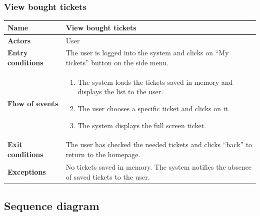 \subsubsection{View bought tickets}
\begin{table}[!h]
	\centering
	{\renewcommand{\arraystretch}{2}%
		\begin{tabular}{|l|p{12cm}|}
			\hline
			\textbf{Name} 				& \textbf{View bought tickets} \\ \hline
			\textbf{Actors} 			& User \\ \hline
			\textbf{Entry conditions} 	& The user is logged into the system and clicks on “My tickets” button on the side menu. \\ \hline
			\textbf{Flow of events}		& \begin{minipage}[t]{0.75\textwidth}
				\begin{enumerate}
					\item The system loads the tickets saved in memory and displays the list to the user.
					\item The user chooses a specific ticket and clicks on it.
					\item The system displays the full screen ticket.
				\end{enumerate}
			\end{minipage}	\\ \hline
			\textbf{Exit conditions}	& The user has checked the needed tickets and clicks “back” to return to the homepage.   \\ \hline
			\textbf{Exceptions}			& No tickets saved in memory. The system notifies the absence of saved tickets to the user. \\ \hline
	\end{tabular}}
\end{table}
\clearpage

\subsection{Sequence diagram}
